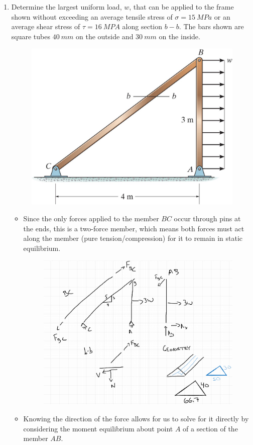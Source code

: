 \documentclass[12pt, oneside]{article}
\begin{document}
\begin{enumerate}
	\item %
		Determine the largest uniform load, $w$, that can be applied to the frame shown without exceeding an average tensile stress of $\sigma = \SI{15}{MPa}$ or an average shear stress of $\tau = \SI{16}{MPA}$ along section $b-b$.
		The bars shown are square tubes $\SI{40}{mm}$ on the outside and $\SI{30}{mm}$ on the inside.
		\begin{figure}[H]
			\centering
			\includegraphics[width=0.6\linewidth]{truss}
			\label{fig:truss}
		\end{figure}
		\begin{itemize}
			\item Since the only forces applied to the member $BC$ occur through pins at the ends, this is a two-force member, which means both forces must act along the member (pure tension/compression) for it to remain in static equilibrium.
				\begin{figure}[H]
					\centering
					\includegraphics[width=0.7\linewidth]{hw1-4}
				\end{figure}
			\item Knowing the direction of the force allows for us to solve for it directly by considering the moment equilibrium about point $A$ of a section of the member $AB$.
			\begin{align*}

\end{align*}
\end{itemize}
\end{enumerate}
\end{document}
